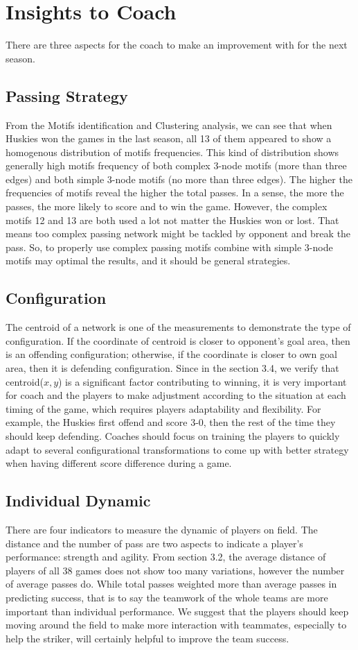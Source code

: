 \documentclass{mcmthesis}
\begin{document}
\section{Insights to Coach}
There are three aspects for the coach to make an improvement with for the next season.
\subsection{Passing Strategy}
From the Motifs identification and Clustering analysis, we can see that when Huskies won the games in the last season, all 13 of them appeared to show a homogenous distribution of motifs frequencies. This kind of distribution shows generally high motifs frequency of both complex 3-node motifs (more than three edges) and both simple 3-node motifs (no more than three edges). The higher the frequencies of motifs reveal the higher the total passes. In a sense, the more the passes, the more likely to score and to win the game. However, the complex motifs 12 and 13 are both used a lot not matter the Huskies won or lost. That means too complex passing network might be tackled by opponent and break the pass. So, to properly use complex passing motifs combine with simple 3-node motifs may optimal the results, and it should be general strategies.
\subsection{Configuration}
The centroid of a network is one of the measurements to demonstrate the type of configuration. If the coordinate of centroid is closer to opponent’s goal area, then is an offending configuration; otherwise, if the coordinate is closer to own goal area, then it is defending configuration. Since in the section 3.4, we verify that centroid($x,y$) is a significant factor contributing to winning, it is very important for coach and the players to make adjustment according to the situation at each timing of the game, which requires players adaptability and flexibility. For example, the Huskies first offend and score 3-0, then the rest of the time they should keep defending. Coaches should focus on training the players to quickly adapt to several configurational transformations to come up with better strategy when having different score difference during a game.
\subsection{Individual Dynamic}
There are four indicators to measure the dynamic of players on field. The distance and the number of pass are two aspects to indicate a player’s performance: strength and agility. From section 3.2, the average distance of players of all 38 games does not show too many variations, however the number of average passes do. While total passes weighted more than average passes in predicting success, that is to say the teamwork of the whole teams are more important than individual performance. We suggest that the players should keep moving around the field to make more interaction with teammates, especially to help the striker, will certainly helpful to improve the team success.
\end{document}
